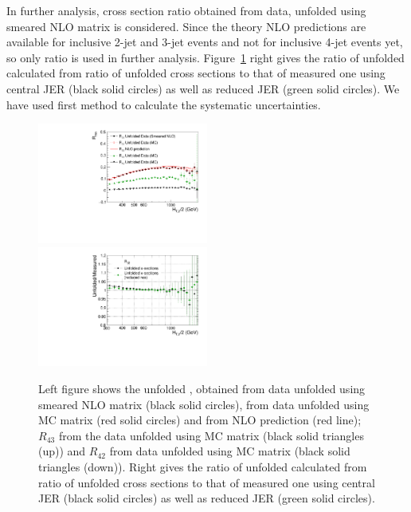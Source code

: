 In further analysis, cross section ratio obtained from data, unfolded using smeared NLO matrix is considered. Since the theory NLO predictions are available for inclusive 2-jet and 3-jet events and not for inclusive 4-jet events yet, so only ratio \ratio is used in further analysis. Figure~\ref{fig:ratio_unfolded_32} right gives the ratio of unfolded \ratio calculated from ratio of unfolded cross sections to that of measured one using central JER (black solid circles) as well as reduced JER (green solid circles).  We have used first method to calculate the systematic uncertainties.

 \begin{figure}[!htbp]
  \begin{center}
    \includegraphics[width=0.5\textwidth]{Plots_HT_2_150/Ratio_32_43_42_unfolded_all_HT_2_150.pdf}%
    \includegraphics[width=0.5\textwidth]{Plots_HT_2_150/Ratio_Unfolding_data_NLO_ratio32.pdf}\\
    \caption{Left figure shows the unfolded \ratio,  obtained from data unfolded using smeared NLO matrix (black solid circles), from data unfolded using MC matrix (red 
    solid circles) and from NLO prediction (red line); $R_{43}$ from the data unfolded using MC matrix (black solid triangles (up)) and $R_
    {42}$ from data unfolded using MC matrix (black solid triangles (down)). Right gives the ratio of unfolded \ratio calculated from ratio of unfolded cross sections to that of measured one using central JER (black solid circles) as well as reduced JER (green solid circles).}
    \label{fig:ratio_unfolded_32}
  \end{center}
\end{figure}

